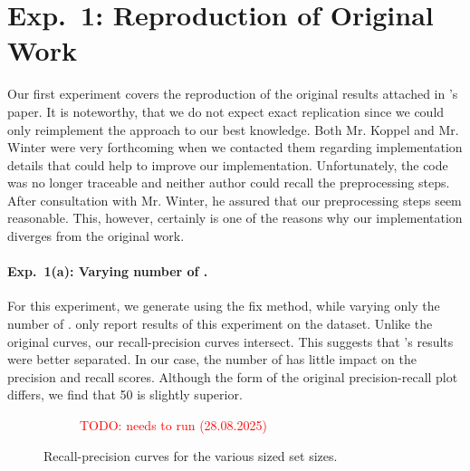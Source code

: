 
\section{Exp.\ 1: Reproduction of Original Work}

Our first experiment covers the reproduction of the original results attached in \citet{koppel_determining_2014}'s paper.
It is noteworthy, that we do not expect exact replication since we could only reimplement the approach to our best knowledge.
Both Mr. Koppel and Mr. Winter were very forthcoming when we contacted them regarding implementation details that could help to improve our implementation.
Unfortunately, the code was no longer traceable and neither author could recall the preprocessing steps.
After consultation with Mr. Winter, he assured that our preprocessing steps seem reasonable.
This, however, certainly is one of the reasons why our implementation diverges from the original work.

\paragraph{Exp.\ 1(a): Varying number of \imps{}.}

For this experiment, we generate \imps{} using the fix method, while varying only the number of \imps{}.
\citet{koppel_determining_2014} only report results of this experiment on the \dataBlog{} dataset.
Unlike the original curves, our \impAppr{} recall-precision curves intersect.
This suggests that \citet{koppel_determining_2014}'s results were better separated.
In our case, the number of \imps{} has little impact on the precision and recall scores.
Although the form of the original precision-recall plot differs, we find that 50 \imps{} is slightly superior.

\begin{figure}[htbp]
  \centering
  \begin{subfigure}[b]{0.48\textwidth}
    \centering
    
    \caption{\dataBlog{} \textcolor{red}{TODO: needs to run (28.08.2025)}}
    \label{fig:blog_dif_n}
  \end{subfigure}
  \hfill
  \begin{subfigure}[b]{0.48\textwidth}
    \centering
    
    \caption{\dataStudent{}}
    \label{fig:student_essays_dif_n}
  \end{subfigure}
  \caption{Recall-precision curves for the various sized \imp{} set sizes.}
  \label{fig:repr_diff_n_imps_fixed}
\end{figure}


